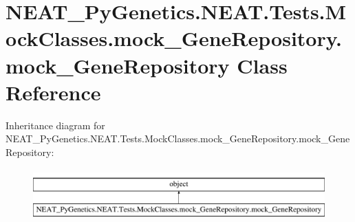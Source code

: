 \hypertarget{class_n_e_a_t___py_genetics_1_1_n_e_a_t_1_1_tests_1_1_mock_classes_1_1mock___gene_repository_1_1mock___gene_repository}{}\section{N\+E\+A\+T\+\_\+\+Py\+Genetics.\+N\+E\+A\+T.\+Tests.\+Mock\+Classes.\+mock\+\_\+\+Gene\+Repository.\+mock\+\_\+\+Gene\+Repository Class Reference}
\label{class_n_e_a_t___py_genetics_1_1_n_e_a_t_1_1_tests_1_1_mock_classes_1_1mock___gene_repository_1_1mock___gene_repository}
Inheritance diagram for N\+E\+A\+T\+\_\+\+Py\+Genetics.\+N\+E\+A\+T.\+Tests.\+Mock\+Classes.\+mock\+\_\+\+Gene\+Repository.\+mock\+\_\+\+Gene\+Repository\+:\begin{figure}[H]
\begin{center}
\leavevmode
\includegraphics[height=2.000000cm]{class_n_e_a_t___py_genetics_1_1_n_e_a_t_1_1_tests_1_1_mock_classes_1_1mock___gene_repository_1_1mock___gene_repository}
\end{center}
\end{figure}
